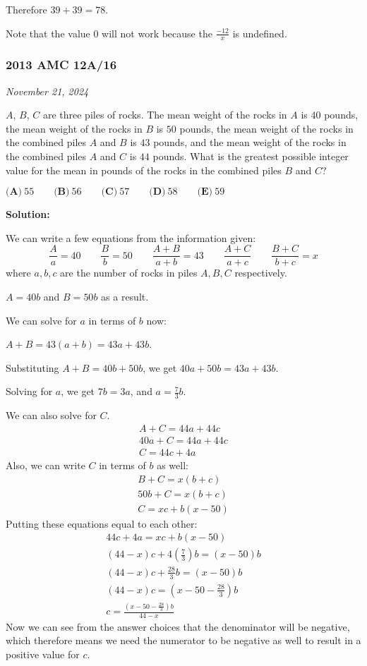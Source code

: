 \documentclass[../mathproblems.tex]{subfiles}
\begin{document}
Therefore $39+39=\boxed{78}$.

Note that the value $0$ will not work because the $\frac{-12}{x}$ is undefined. 

\noindent\hrulefill
\subsubsection*{2013 AMC 12A/16} 
\textit{November 21, 2024}

$A$, $B$, $C$ are three piles of rocks. The mean weight of the rocks in $A$ is $40$ pounds, the mean weight of the rocks in $B$ is $50$ pounds, the mean weight of the rocks in the combined piles $A$ and $B$ is $43$ pounds, and the mean weight of the rocks in the combined piles $A$ and $C$ is $44$ pounds. What is the greatest possible integer value for the mean in pounds of the rocks in the combined piles $B$ and $C$?

$\textbf{(A)} \ 55 \qquad \textbf{(B)} \ 56 \qquad \textbf{(C)} \ 57 \qquad \textbf{(D)} \ 58 \qquad \textbf{(E)} \ 59$

\textbf{Solution:}

We can write a few equations from the information given:
\[\frac{A}{a}=40 \qquad \frac{B}{b} = 50 \qquad \frac{A+B}{a+b} = 43 \qquad \frac{A+C}{a+c} \qquad \frac{B+C}{b+c} = x\]where $a,b,c$ are the number of rocks in piles $A,B,C$ respectively.

$A=40b$ and $B=50b$ as a result.

We can solve for $a$ in terms of $b$ now:

$A+B=43(a+b) = 43a + 43b$.

Substituting $A+B=40b+50b$, we get $40a+50b=43a+43b$.

Solving for $a$, we get $7b=3a$, and $a=\frac{7}{3}b$.

We can also solve for $C$.
\begin{align*} A+C=44a+44c\\ 40a+C = 44a+44c\\ C = 44c+4a \end{align*}
Also, we can write $C$ in terms of $b$ as well:
\begin{align*} B+C=x(b+c)\\ 50b+C=x(b+c)\\ C = xc+b(x-50) \end{align*}
Putting these equations equal to each other:
\begin{align*} 44c+4a=xc+b(x-50)\\ (44-x)c+4\left(\frac{7}{3}\right)b=(x-50)b\\ (44-x)c+\frac{28}{3}b=(x-50)b\\ (44-x)c=\left(x-50-\frac{28}{3}\right)b\\ c = \frac{\left(x-50-\frac{28}{3}\right)b}{44-x} \end{align*}
Now we can see from the answer choices that the denominator will be negative, which therefore means we need the numerator to be negative as well to result in a positive value for $c$.
\end{document}
